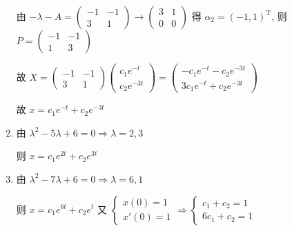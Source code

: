\begin{enumerate}
                   由 \( -\lambda-A = \begin{pmatrix}
                       -1 & -1 \\
                       3  & 1
                   \end{pmatrix} \rightarrow \begin{pmatrix}
                       3 & 1 \\
                       0 & 0
                   \end{pmatrix} \) 得 \( \alpha_{2} = (-1, 1)^{\mathrm{T}} \), 则 \( P = \begin{pmatrix}
                       -1 & -1 \\
                       1  & 3
                   \end{pmatrix} \)

                   故 \( X = \begin{pmatrix}
                       -1 & -1 \\
                       3  & 1
                   \end{pmatrix}\begin{pmatrix}
                       c_{1}e^{-t} \\
                       c_{2}e^{-3t}
                   \end{pmatrix} = \begin{pmatrix}
                       -c_{1}e^{-t} - c_{2}e^{-3t} \\
                       3c_{1}e^{-t} + c_{2}e^{-3t}
                   \end{pmatrix} \)

                   故 \( x = c_{1}e^{-t} + c_{2}e^{-3t} \)
             \item %
                   由 \( \lambda^{2} - 5\lambda + 6 = 0 \Rightarrow \lambda = 2, 3 \)

                   则 \( x = c_{1}e^{2t} + c_{2}e^{3t} \)
             \item %
                   由 \( \lambda^{2} - 7\lambda + 6 = 0 \Rightarrow \lambda = 6, 1 \)

                   则 \( x = c_{1}e^{6t} + c_{2}e^{t} \) 又 \( \begin{cases}
                       x(0) = 1 \\
                       x'(0) = 1
                   \end{cases} \Rightarrow \begin{cases}
                       c_{1} + c_{2} = 1 \\
                       6c_{1} + c_{2} = 1
                   \end{cases} \)


\end{enumerate}
